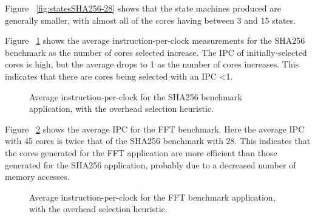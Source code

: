 \documentclass{UoYCSproject}
\begin{document}
Figure ~\ref{fig:statesSHA256-28} shows that the state machines produced are generally smaller,
with almost all of the cores having between 3 and 15 states.

Figure ~\ref{fig:ipcSHA256} shows the average instruction-per-clock measurements for the SHA256 benchmark as
the number of cores selected increase. The IPC of initially-selected cores
is high, but the average drops to 1 as the number of cores increases. This indicates that
there are cores being selected with an IPC <1.

\begin{figure}[H]
\caption{Average instruction-per-clock for the SHA256 benchmark application, with the overhead selection heuristic.}
\label{fig:ipcSHA256}
\end{figure}

Figure ~\ref{fig:ipcFFT} shows the average IPC for the FFT benchmark.
Here the average IPC with 45 cores is twice that of the SHA256 benchmark with 28.
This indicates that the cores generated for the FFT application are more efficient
than those generated for the SHA256 application, probably due to a decreased number of memory
accesses.

\begin{figure}[H]
\caption{Average instruction-per-clock for the FFT benchmark application, with the overhead selection heuristic.}
\label{fig:ipcFFT}
\end{figure}
\end{document}
